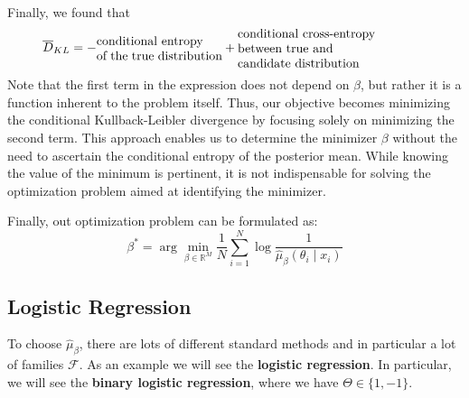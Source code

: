 Finally, we found that
\[
    \overline{D}_{KL} = - \parbox{10em}{conditional entropy \\of the true distribution} + \parbox{15em}{ conditional cross-entropy\\ between true and \\ candidate distribution}
\]
Note that the first term in the expression does not depend on $\beta$, but rather it is a function inherent to the problem itself. 
Thus, our objective becomes minimizing the conditional Kullback-Leibler divergence by focusing solely on minimizing the second term. This approach enables us to determine the minimizer $\beta$ without the need to ascertain the conditional entropy of the posterior mean. While knowing the value of the minimum is pertinent, it is not indispensable for solving the optimization problem aimed at identifying the minimizer. 


Finally, out optimization problem can be formulated as:
\[
    \beta^\ast = \arg\min_{\beta \in \mathbb{R}^M} \frac{1}{N} \sum_{i=1}^{N} \log \frac{1}{\hat{\mu}_\beta(\theta_i \mid x_i)}
\]

\subsection*{Logistic Regression}
To choose $\hat{\mu}_\beta$, there are lots of different standard methods and in particular a lot of families $\mathcal F$. As an example we will see the \textbf{logistic regression}. In particular, we will see the \textbf{binary logistic regression}, where we have $\Theta \in \{1,-1\}$.

